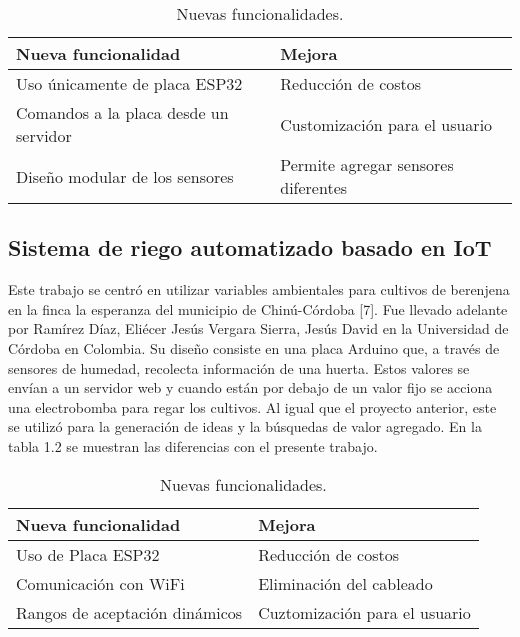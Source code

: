 \begin{table}[h]
	\centering
	\caption[Nuevas funcionalidades sobre el proyecto de Cadavid y Garcia]{Nuevas funcionalidades.}
	\begin{tabular}{l l}    
		\toprule
		\textbf{Nueva funcionalidad} & \textbf{Mejora}\\	
		\midrule
		Uso únicamente de placa ESP32           & Reducción de costos	\\		
		Comandos a la placa desde un servidor          & Customización para el usuario\\	
		Diseño modular de los sensores          & Permite agregar sensores diferentes\\	
		\bottomrule
		\hline
	\end{tabular}
	\label{tab:peces}
\end{table}

\subsection{Sistema de riego automatizado basado en IoT}
Este trabajo se centró en utilizar variables ambientales para cultivos de berenjena en la finca la esperanza del municipio de Chinú-Córdoba [7]. Fue llevado adelante por Ramírez Díaz, Eliécer Jesús Vergara Sierra, Jesús David en la Universidad de Córdoba en Colombia. 
Su diseño consiste en una placa Arduino que, a través de sensores de humedad, recolecta información de una huerta. Estos valores se envían a un servidor web y cuando están por debajo de un valor fijo se acciona una electrobomba para regar los cultivos. Al igual que el proyecto anterior, este se utilizó para la generación de ideas y la búsquedas de valor agregado. En la tabla 1.2 se muestran las diferencias con el presente trabajo.\\

\begin{table}[h]
	\centering
	\caption[Nuevas funcionalidades sobre el proyecto de Díaz, Sierra y David]{Nuevas funcionalidades.}
	\begin{tabular}{l l}    
		\toprule
		\textbf{Nueva funcionalidad} & \textbf{Mejora}\\	
		\midrule
		Uso de Placa ESP32           & Reducción de costos	\\		
		Comunicación con WiFi          & Eliminación del cableado\\	
		Rangos de aceptación dinámicos          & Cuztomización para el usuario\\		
		\bottomrule
		\hline
	\end{tabular}
	\label{tab:peces}\\
\end{table}

